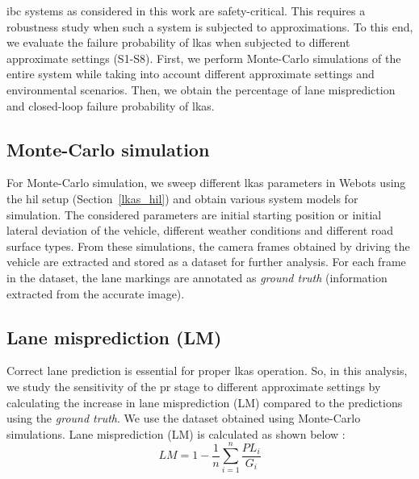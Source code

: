 \Gls{ibc} systems as considered in this work are safety-critical. This requires a robustness study when such a system is subjected to approximations. To this end, we evaluate the failure probability of \gls{lkas} when subjected to different approximate settings (S1-S8). First, we perform Monte-Carlo simulations of the entire system while taking into account different approximate settings and environmental scenarios. Then, we obtain the percentage of lane misprediction and closed-loop failure probability of \gls{lkas}.

\subsection{Monte-Carlo simulation}
For Monte-Carlo simulation, we sweep different \gls{lkas} parameters in Webots using the \gls{hil} setup (Section~\ref{lkas_hil}) and obtain various system models for simulation. The considered parameters are initial starting position or initial lateral deviation of the vehicle, different weather conditions and different road surface types. From these simulations, the camera frames obtained by driving the vehicle are extracted and stored as a dataset for further analysis. For each frame in the dataset, the lane markings are annotated as \textit{ground truth} (information extracted from the accurate image). 

\subsection{Lane misprediction (LM)}\label{sec_lm}
Correct lane prediction is essential for proper \gls{lkas} operation. So, in this analysis, we study the sensitivity of the \gls{pr} stage to different approximate settings by calculating the increase in lane misprediction (LM) compared to the predictions using the \textit{ground truth}. 
We use the dataset obtained using Monte-Carlo simulations. Lane misprediction (LM) is calculated as shown below \cite{tusimple}:
\begin{equation} 
LM = 1 - \dfrac{1}{n}\sum_{i=1}^{n}\dfrac{PL_{i}}{G_{i}}
\nonumber
\end{equation}

